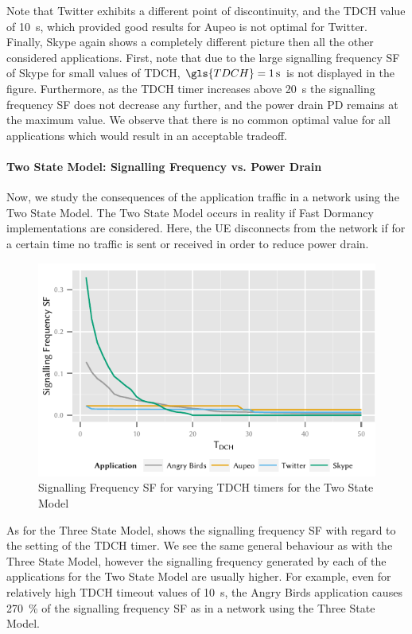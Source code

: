 Note that Twitter exhibits a different point of discontinuity, and the \gls{TDCH} value of \SI{10}{\second}, which provided good results for Aupeo is not optimal for Twitter.
Finally, Skype again shows a completely different picture then all the other considered applications.
First, note that due to the large signalling frequency \gls{SF} of Skype for small values of \gls{TDCH}, \(\gls{TDCH} = \SI{1}{\second}\) is not displayed in the figure.
Furthermore, as the \gls{TDCH} timer increases above \SI{20}{\second} the signalling frequency \gls{SF} does not decrease any further, and the power drain \gls{PD} remains at the maximum value.
We observe that there is no common optimal value for all applications which would result in an acceptable tradeoff.


\paragraph*{Two State Model: Signalling Frequency vs. Power Drain}\label{sec:network:network_traces:numerical_results:two_states}
Now, we study the consequences of the application traffic in a network using the Two State Model.
The Two State Model occurs in reality if Fast Dormancy implementations are considered.
Here, the \gls{UE} disconnects from the network if for a certain time no traffic is sent or received in order to reduce power drain.
\begin{figure}
	\centering
	\includegraphics{network/network_traces/numerical_results/figures/2_state_tdch_vs_frequency}
	\caption{Signalling Frequency \gls{SF} for varying \gls{TDCH} timers for the Two State Model}\label{fig:network:network_traces:numerical_results:two_states:signalling}
\end{figure}
As for the Three State Model,  shows the signalling frequency \gls{SF} with regard to the setting of the \gls{TDCH} timer.
We see the same general behaviour as with the Three State Model, however the signalling frequency generated by each of the applications for the Two State Model are usually higher.
For example, even for relatively high \gls{TDCH} timeout values of \SI{10}{\second}, the Angry Birds application causes \SI{270}{\percent} of the signalling frequency \gls{SF} as in a network using the Three State Model.

